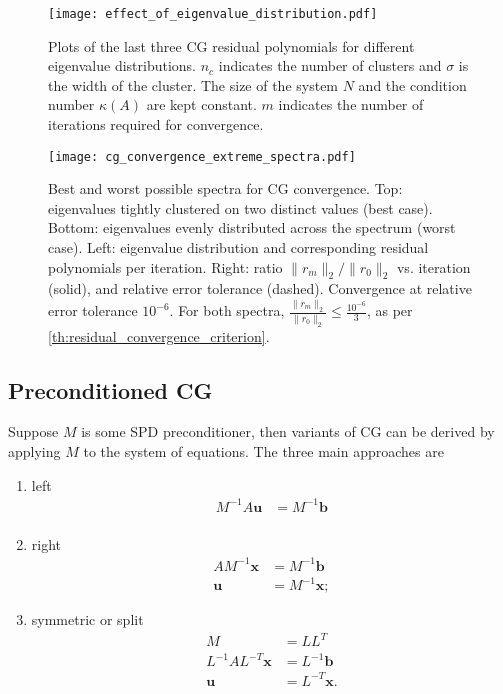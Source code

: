 \begin{figure}[H]
  \centering
  \texttt{[image: effect\_of\_eigenvalue\_distribution.pdf]}
  \caption{Plots of the last three CG residual polynomials for different eigenvalue distributions. $n_c$ indicates the number of clusters and $\sigma$ is the width of the cluster. The size of the system $N$ and the condition number $\kappa(A)$ are kept constant. $m$ indicates the number of iterations required for convergence.}
  \label{fig:cg_effect_of_eigenvalue_distribution}
\end{figure}
\begin{figure}[H]
  \centering
  \texttt{[image: cg\_convergence\_extreme\_spectra.pdf]}
  \caption{Best and worst possible spectra for CG convergence. Top: eigenvalues tightly clustered on two distinct values (best case). Bottom: eigenvalues evenly distributed across the spectrum (worst case). Left: eigenvalue distribution and corresponding residual polynomials per iteration. Right: ratio $\|r_m\|_2/\|r_0\|_2$ vs. iteration (solid), and relative error tolerance (dashed). Convergence at relative error tolerance $10^{-6}$. For both spectra, $\frac{\|r_m\|_2}{\|r_0\|_2} \leq \frac{10^{-6}}{3}$, as per \cref{th:residual_convergence_criterion}.}
  \label{fig:cg_best_worst_spectra}
\end{figure}

\subsection{Preconditioned CG} \label{sec:cg_preconditioning}
Suppose $M$ is some SPD preconditioner, then variants of CG can be derived by applying $M$ to the system of equations. The three main approaches are
\begin{enumerate}[label=\textbf{PCG-\arabic*},ref=\textbf{PCG-type \arabic*},leftmargin=1.25cm]
  \item\label{pcg_type:left} left
        \begin{align*}
          M^{-1}A\mathbf{u} & = M^{-1}\mathbf{b} \\
        \end{align*}
  \item\label{pcg_type:right} right
        \begin{align*}
          AM^{-1}\mathbf{x} & = M^{-1}\mathbf{b}  \\
          \mathbf{u}        & = M^{-1}\mathbf{x};
        \end{align*}
  \item\label{pcg_type:symmetric} symmetric or split
        \begin{align*}
          M                       & = LL^T              \\
          L^{-1}AL^{-T}\mathbf{x} & = L^{-1}\mathbf{b}  \\
          \mathbf{u}              & = L^{-T}\mathbf{x}. \\
        \end{align*}
\end{enumerate}

